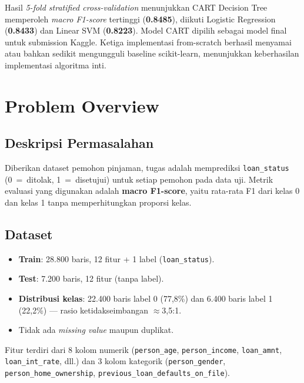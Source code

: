 \documentclass[12pt,a4paper]{article}
\begin{document}
Hasil \textit{5-fold stratified cross-validation} menunjukkan CART Decision Tree memperoleh \textit{macro F1-score} tertinggi (\textbf{0.8485}), diikuti Logistic Regression (\textbf{0.8433}) dan Linear SVM (\textbf{0.8223}). Model CART dipilih sebagai model final untuk submission Kaggle. Ketiga implementasi from-scratch berhasil menyamai atau bahkan sedikit mengungguli baseline scikit-learn, menunjukkan keberhasilan implementasi algoritma inti.

\section{Problem Overview}
\label{sec:problem-overview}

\subsection{Deskripsi Permasalahan}

Diberikan dataset pemohon pinjaman, tugas adalah memprediksi \texttt{loan\_status} (0~=~ditolak, 1~=~disetujui) untuk setiap pemohon pada data uji. Metrik evaluasi yang digunakan adalah \textbf{macro F1-score}, yaitu rata-rata F1 dari kelas 0 dan kelas 1 tanpa memperhitungkan proporsi kelas.

\subsection{Dataset}

\begin{itemize}
    \item \textbf{Train}: 28.800 baris, 12 fitur + 1 label (\texttt{loan\_status}).
    \item \textbf{Test}: 7.200 baris, 12 fitur (tanpa label).
    \item \textbf{Distribusi kelas}: 22.400 baris label 0 (77,8\%) dan 6.400 baris label 1 (22,2\%) --- rasio ketidakseimbangan $\approx$3,5:1.
    \item Tidak ada \textit{missing value} maupun duplikat.
\end{itemize}

\noindent Fitur terdiri dari 8 kolom numerik (\texttt{person\_age}, \texttt{person\_income}, \texttt{loan\_amnt}, \texttt{loan\_int\_rate}, dll.) dan 3 kolom kategorik (\texttt{person\_gender}, \texttt{person\_home\_ownership}, \texttt{previous\_loan\_defaults\_on\_file}).
\end{document}
